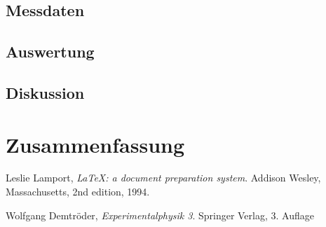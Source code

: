 \documentclass[10pt, a4paper]{article}
\begin{document}
\subsection{Messdaten}
\subsection{Auswertung}
\subsection{Diskussion}


\section{Zusammenfassung}





\begin{thebibliography}{9}

  Leslie Lamport,
  \emph{\LaTeX: a document preparation system}.
  Addison Wesley, Massachusetts,
  2nd edition,
  1994.

	Wolfgang Demtröder,
	\emph{Experimentalphysik 3}.
	Springer Verlag,
	3. Auflage
\end{thebibliography}


\newpage

\begin{appendix}

\end{appendix}
\end{document}
